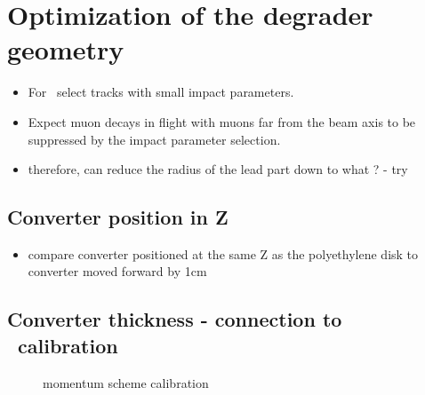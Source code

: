 \section{Optimization of the degrader geometry}

\begin{itemize}
\item 
  For \piplusenu\ select tracks with small impact parameters.
\item 
  Expect muon decays in flight with muons far from the beam axis to be suppressed
  by the impact parameter selection.
\item
  therefore, can reduce the radius of the lead part down to what ? - try 
\end{itemize}

\subsection{Converter position in Z}

\begin{itemize}
\item
  compare converter positioned at the same Z as the polyethylene disk
  to converter moved forward by 1cm 
\end{itemize}

\subsection{Converter thickness - connection to \piplusenu\  calibration}

\begin{figure}[H]
  \caption{
    \label{figure:sum_mom_vd13}
    momentum scheme calibration
  }
\end{figure}

